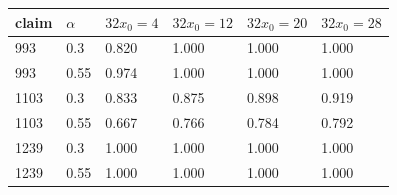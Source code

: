 \begin{tabular}{llllll}
\toprule
claim & $\alpha$ & $32x_0=4$ & $32x_0=12$ & $32x_0=20$ & $32x_0=28$ \\
\midrule
993 & 0.3 & 0.820 & 1.000 & 1.000 & 1.000 \\
993 & 0.55 & 0.974 & 1.000 & 1.000 & 1.000 \\
1103 & 0.3 & 0.833 & 0.875 & 0.898 & 0.919 \\
1103 & 0.55 & 0.667 & 0.766 & 0.784 & 0.792 \\
1239 & 0.3 & 1.000 & 1.000 & 1.000 & 1.000 \\
1239 & 0.55 & 1.000 & 1.000 & 1.000 & 1.000 \\
\bottomrule
\end{tabular}